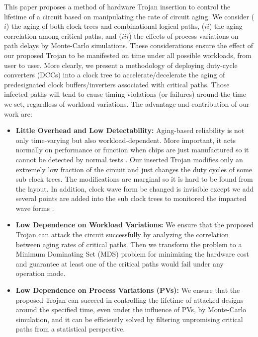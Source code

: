 This paper proposes a method of hardware Trojan insertion to control the lifetime of a circuit based on manipulating the rate of circuit aging. We consider ($i$) the aging of both clock trees and combinational logical paths, ($ii$) the aging correlation among critical paths, and ($iii$) the effects of process variations on path delays by Monte-Carlo simulations.  These considerations ensure the effect of our proposed Trojan to be manifested on time under all possible workloads, from user to user. More clearly, we present a methodology of deploying duty-cycle converters (DCCs) into a clock tree to accelerate/decelerate the aging of predesignated clock buffers/inverters associated with critical paths. Those infected paths will tend to cause timing violations (or failures) around the time we set, regardless of workload variations. The advantage and contribution of our work are:
\begin{itemize}[leftmargin=*]
	\item \textbf{Little Overhead and Low Detectability:} Aging-based reliability is not only time-varying but also workload-dependent. More important, it acts normally on performance or function when chips are just manufactured so it cannot be detected by normal tests \cite{sreedhar2012reliability}. Our inserted Trojan modifies only an extremely low fraction of the circuit and just changes the duty cycles of some sub clock trees. The modifications are marginal so it is hard to be found from the layout. In addition, clock wave form be changed is invisible except we add several points are added into the sub clock trees to monitored the impacted wave forms \cite{sreedhar2012reliability}.
	\item \textbf{Low Dependence on Workload Variations:} We ensure that the proposed Trojan can attack the circuit successfully by analyzing the correlation between aging rates of critical paths. Then we transform the problem to a Minimum Dominating Set (MDS) problem for minimizing the hardware cost and guarantee at least one of the critical paths would fail under any operation mode.
	\item \textbf{Low Dependence on Process Variations (PVs):} We ensure that the proposed Trojan can succeed in controlling the lifetime of attacked designs around the specified time, even under the influence of PVs, by Monte-Carlo simulation, and it can be efficiently solved by filtering unpromising critical paths from a statistical perspective. 
\end{itemize}
